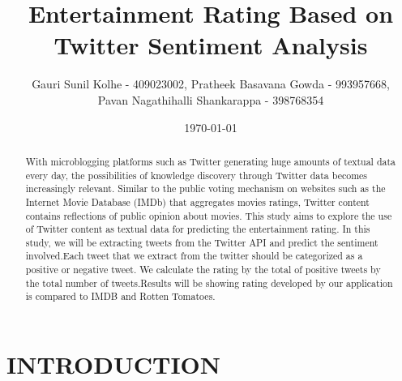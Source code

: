 \documentclass[a4paper]{article}
\title{Entertainment Rating Based on Twitter
Sentiment Analysis}
\author{Gauri Sunil Kolhe - 409023002, Pratheek Basavana Gowda - 993957668,\\ Pavan
Nagathihalli Shankarappa - 398768354}
\date{\today}
\begin{document}
\maketitle

\begin{abstract}
With microblogging platforms such as Twitter generating
huge amounts  of textual data every day, the possibilities of knowledge
discovery through Twitter data becomes increasingly relevant. Similar
to the public voting mechanism on websites such as the Internet Movie
Database (IMDb) that aggregates movies ratings, Twitter content contains
reflections of public opinion about movies. This study aims to explore
the use of Twitter content as textual data for predicting the entertainment
rating. In this study, we will be extracting tweets from the
Twitter API and predict the sentiment involved.Each tweet that we extract
from the twitter should be categorized as a positive or negative
tweet. We calculate the rating by the total of positive tweets by the total
number of tweets.Results will be showing rating developed by our
application is compared to IMDB and Rotten Tomatoes.
\end{abstract}

\section{INTRODUCTION}
\label{sec:introduction}
\end{document}
